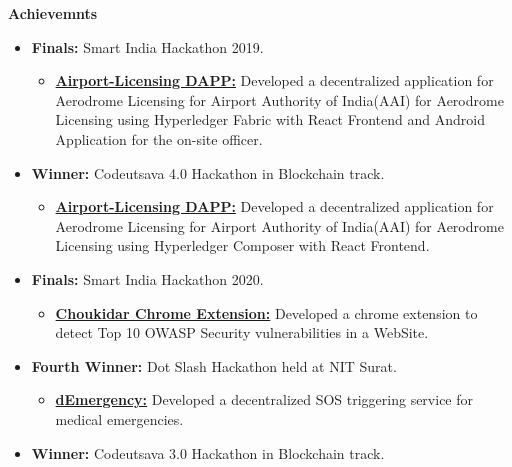 \documentclass{article}
\begin{document}
\vspace{10pt}
\noindent \large \textbf{\textcolor{NavyBlue}{Achievemnts}}
\begin{itemize}[noitemsep,nolistsep,leftmargin=*]
    \item { \normalsize \textbf{Finals:} Smart India Hackathon 2019. 
        \begin{itemize}
            \item \normalsize \href{https://github.com/Shritesh99/airport}{\textbf{Airport-Licensing DAPP:}} Developed a decentralized application for Aerodrome Licensing for Airport Authority of India(AAI) for Aerodrome Licensing using Hyperledger Fabric with React Frontend and Android Application for the on-site officer.
        \end{itemize}
    }
    \item { \normalsize \textbf{Winner:} Codeutsava 4.0 Hackathon in Blockchain track.
        \begin{itemize}
            \item \normalsize \href{https://github.com/Shritesh99/airport}{\textbf{Airport-Licensing DAPP:}} Developed a decentralized application for Aerodrome Licensing for Airport Authority of India(AAI) for Aerodrome Licensing using Hyperledger Composer with React Frontend.
        \end{itemize}
    }
    \item { \normalsize \textbf{Finals:} Smart India Hackathon 2020. 
        \begin{itemize}
            \item \normalsize \href{https://github.com/siddharthshah3030/choukidar-owasp-security-chrome-extension}{\textbf{Choukidar Chrome Extension:}} Developed a chrome extension to detect Top 10 OWASP Security vulnerabilities in a WebSite.
        \end{itemize}
    }
    \item { \normalsize \textbf{Fourth Winner:} Dot Slash Hackathon held at NIT Surat. 
        \begin{itemize}
            \item \normalsize \href{https://bit.ly/31wXfMr}{\textbf{dEmergency:}} Developed a decentralized SOS triggering service for medical emergencies.
        \end{itemize}
    }
    \item { \normalsize \textbf{Winner:} Codeutsava 3.0 Hackathon in Blockchain track.
}
\end{itemize}
\end{document}
